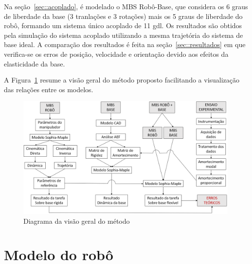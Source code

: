 Na seção~\ref{sec::acoplado}, é modelado o MBS Robô-Base, que considera os 6
graus de liberdade da base (3 tranlações e 3 rotações) mais os 5 graus de
liberdade do robô, formando um sistema único acoplado de 11 gdl. Os resultados
são obtidos pela simulação do sistema acoplado utilizando a mesma trajetória do
sistema de base ideal. A comparação dos resultados é feita na
seção~\ref{sec::resultados} em que verifica-se os erros de posição, velocidade e
orientação devido aos efeitos da elasticidade da base.

A Figura~\ref{fig::visgeral} resume a visão geral
do método proposto facilitando a visualização das relações entre os modelos.

\begin{figure}[h]
	\centering 
 	\includegraphics[width=0.99\textwidth]{figs/visgeral}
 	\caption{Diagrama da visão geral do método}
 	\label{fig::visgeral}
\end{figure}



\section{Modelo do robô} \label{sec::robo}


